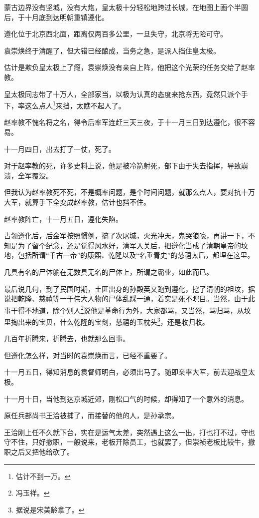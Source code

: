 \begin{multicols}{\theparacolNo}
蒙古边界没有坚城，没有大炮，皇太极十分轻松地跨过长城，在地图上画个半圆后，于十月底到达明朝重镇遵化。

遵化位于北京西北面，距离仅两百多公里，一旦失守，北京将无险可守。

袁崇焕终于清醒了，但大错已经酿成，当务之急，是派人挡住皇太极。

估计是欺负皇太极上了瘾，袁崇焕没有亲自上阵，他把这个光荣的任务交给了赵率教。

皇太极同志带了十万人，全部家当，以极为认真的态度来抢东西，竟然只派个手下，率这么点人\footnote{估计不到一万。}来挡，太瞧不起人了。

赵率教不愧名将之名，得令后率军连赶三天三夜，于十一月三日到达遵化，很不容易。

十一月四日，出去打了一仗，死了。

对于赵率教的死，许多史料上说，他是被冷箭射死，部下由于失去指挥，导致崩溃，全军覆没。

但我认为赵率教死不死，不是概率问题，是个时间问题，就那么点人，要对抗十万大军，就算手下全变成赵率教，估计也挡不住。

赵率教阵亡，十一月五日，遵化失陷。

占领遵化后，后金军按照惯例，搞了次屠城，火光冲天，鬼哭狼嚎，再讲一下，不知是为了留个纪念，还是觉得风水好，清军入关后，把遵化当成了清朝皇帝的坟地，包括所谓“千古一帝”的康熙、乾隆以及“名垂青史”的慈禧太后，都埋在这里。

几具有名的尸体躺在无数具无名的尸体上，所谓之霸业，如此而已。

最后说几句，到了民国时期，土匪出身的孙殿英又跑到遵化，挖了清朝的祖坟，据说把乾隆、慈禧等一干伟大人物的尸体乱踩一通，着实是死不瞑目。当然，由于此事干得不地道，除个别人\footnote{冯玉祥。}说他是革命行为外，大家都骂，又当然，骂归骂，从坟里掏出来的宝贝，什么乾隆的宝剑，慈禧的玉枕头\footnote{据说是宋美龄拿了。}，还是收归收。

几百年折腾来，折腾去，也就那么回事。

但遵化怎么样，对当时的袁崇焕而言，已经不重要了。

十一月五日，得知消息的袁督师明白，必须出马了。随即亲率大军，前去迎战皇太极。

十一月十日，当他到达京城近郊，刚松口气的时候，却得知了一个意外的消息。

原任兵部尚书王洽被捕了，而接替的他的人，是孙承宗。

王洽刚上任不久就下台，实在是运气太差，突然遇上这么一出，打也打不过，守也守不住，只好撤职，一般说来，老板开除员工，也就罢了，但崇祯老板比较牛，撤职之后又把他给砍了。


\end{multicols}
